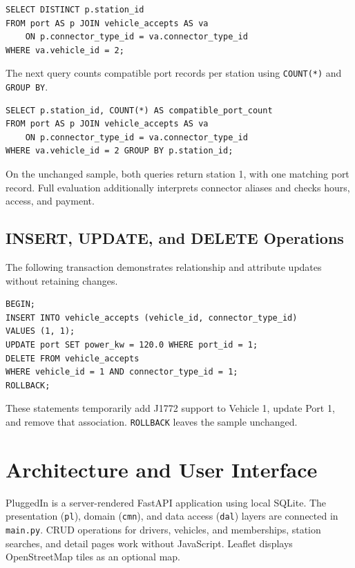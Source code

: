 \documentclass[sigconf,screen,nonacm]{acmart}
\begin{document}
{\footnotesize
\begin{verbatim}
SELECT DISTINCT p.station_id
FROM port AS p JOIN vehicle_accepts AS va
    ON p.connector_type_id = va.connector_type_id
WHERE va.vehicle_id = 2;
\end{verbatim}
}

The next query counts compatible port records per station using \texttt{COUNT(*)} and \texttt{GROUP BY}.

{\footnotesize
\begin{verbatim}
SELECT p.station_id, COUNT(*) AS compatible_port_count
FROM port AS p JOIN vehicle_accepts AS va
    ON p.connector_type_id = va.connector_type_id
WHERE va.vehicle_id = 2 GROUP BY p.station_id;
\end{verbatim}
}

On the unchanged sample, both queries return station 1, with one matching port record. Full evaluation additionally interprets connector aliases and checks hours, access, and payment.

\subsection{INSERT, UPDATE, and DELETE Operations}
The following transaction demonstrates relationship and attribute updates without retaining changes.

{\footnotesize
\begin{verbatim}
BEGIN;
INSERT INTO vehicle_accepts (vehicle_id, connector_type_id)
VALUES (1, 1);
UPDATE port SET power_kw = 120.0 WHERE port_id = 1;
DELETE FROM vehicle_accepts
WHERE vehicle_id = 1 AND connector_type_id = 1;
ROLLBACK;
\end{verbatim}
}

These statements temporarily add J1772 support to Vehicle 1, update Port 1, and remove that association. \texttt{ROLLBACK} leaves the sample unchanged.

\section{Architecture and User Interface}

PluggedIn is a server-rendered FastAPI application using local SQLite. The presentation (\texttt{pl}), domain (\texttt{cmn}), and data access (\texttt{dal}) layers are connected in \texttt{main.py}. CRUD operations for drivers, vehicles, and memberships, station searches, and detail pages work without JavaScript. Leaflet displays OpenStreetMap tiles as an optional map.
\end{document}
